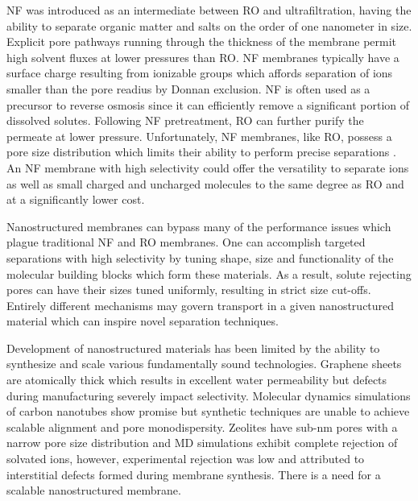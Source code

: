 \documentclass{article}
\begin{document}
  NF was introduced as an intermediate between RO and ultrafiltration, having
  the ability to separate organic matter and salts on the order of one nanometer
  in size. Explicit pore pathways running through the thickness of the membrane
  permit high solvent fluxes at lower pressures than RO. NF membranes typically
  have a surface charge resulting from ionizable groups which affords separation
  of ions smaller than the pore readius by Donnan exclusion.
  \cite{van_der_bruggen_review_2003} NF is often used as a precursor to reverse
  osmosis since it can efficiently remove a significant portion of dissolved
  solutes. Following NF pretreatment, RO can further purify the permeate at lower
  pressure. Unfortunately, NF membranes, like RO, possess a pore size
  distribution which limits their ability to perform precise separations
  \cite{bowen_modelling_2002}. An NF membrane with high selectivity could offer
  the versatility to separate ions as well as small charged and uncharged
  molecules to the same degree as RO and at a significantly lower cost.

  Nanostructured membranes can bypass many of the performance issues which
  plague traditional NF and RO membranes. One can accomplish targeted separations
  with high selectivity by tuning shape, size and functionality of the molecular
  building blocks which form these materials. As a result, solute rejecting pores
  can have their sizes tuned uniformly, resulting in strict size cut-offs.
  Entirely different mechanisms may govern transport in a given nanostructured
  material which can inspire novel separation techniques.

  Development of nanostructured materials has been limited by the ability to
  synthesize and scale various fundamentally sound technologies.  Graphene sheets
  are atomically thick which results in excellent water permeability but defects
  during manufacturing severely impact selectivity.
  \cite{cohen-tanugi_multilayer_2016} Molecular dynamics simulations of carbon
  nanotubes show promise \cite{humplik_nanostructured_2011} but synthetic
  techniques are unable to achieve scalable alignment and pore monodispersity.
  \cite{hata_water-assisted_2004,maruyama_growth_2005} Zeolites have sub-nm pores
  with a narrow pore size distribution and MD simulations exhibit complete
  rejection of solvated ions, \cite{murad_molecular_1998} however, experimental
  rejection was low and attributed to interstitial defects formed during membrane
  synthesis. \cite{li_desalination_2004} There is a need for a scalable
  nanostructured membrane. 
\end{document}
